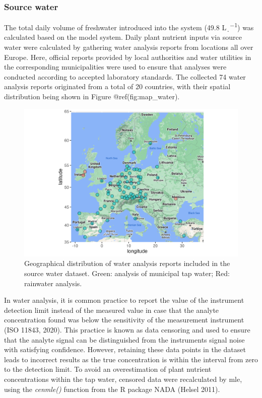 \documentclass[preprint, 3p,
authoryear]{elsarticle} %
\begin{document}
\hypertarget{source-water}{%
\subsubsection{Source water}\label{source-water}}

The total daily volume of freshwater introduced into the system (49.8
\si{\L\per\d}) was calculated based on the model system. Daily plant
nutrient inputs via source water were calculated by gathering water
analysis reports from locations all over Europe. Here, official reports
provided by local authorities and water utilities in the corresponding
municipalities were used to ensure that analyses were conducted
according to accepted laboratory standards. The collected 74 water
analysis reports originated from a total of 20 countries, with their
spatial distribution being shown in Figure @ref(fig:map\_water).

\begin{figure}
\centering
  \includegraphics{../plots/map.png}
  \caption{Geographical distribution of water analysis reports included in the source water dataset. Green: analysis of municipal tap water; Red: rainwater analysis.}
  \label{fig:map_water}
\end{figure}

In water analysis, it is common practice to report the value of the
instrument detection limit instead of the measured value in case that
the analyte concentration found was below the sensitivity of the
measurement instrument (ISO 11843, 2020). This practice is known as data
censoring and used to ensure that the analyte signal can be
distinguished from the instruments signal noise with satisfying
confidence. However, retaining these data points in the dataset leads to
incorrect results as the true concentration is within the interval from
zero to the detection limit. To avoid an overestimation of plant
nutrient concentrations within the tap water, censored data were
recalculated by \gls{mle}, using the \emph{cenmle()} function from the R
package NADA (Helsel 2011).
\end{document}
